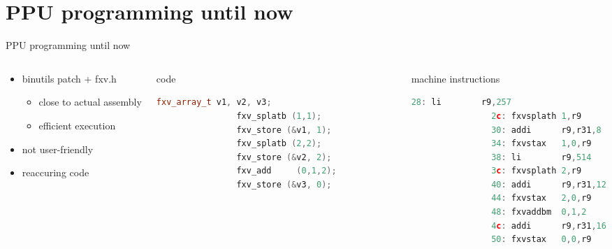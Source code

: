 \documentclass[10pt]{beamer}
\begin{document}
\section{PPU programming until now}
\begin{frame}[fragile]{PPU programming until now}
	\begin{columns}[t]
		\begin{column}{0.35\textwidth}
    		\begin{itemize}
				\item binutils patch + fxv.h
					\begin{itemize}
						\item close to actual assembly
						\item efficient execution
					\end{itemize}
				\item not user-friendly
				\item reaccuring code
			\end{itemize}    
    	\end{column}    
    	\begin{column}{0.25\textwidth}
     		\begin{block}{code}
        		\begin{lstlisting}[language=C++,basicstyle=\ttfamily\scriptsize,keywordstyle=\color{red}]
				fxv_array_t v1, v2, v3;
				fxv_splatb (1,1);
				fxv_store (&v1, 1);
				fxv_splatb (2,2);
				fxv_store (&v2, 2);
				fxv_add 	(0,1,2);
				fxv_store (&v3, 0);				
				\end{lstlisting}
      		\end{block}
    	\end{column}
    	\begin{column}{0.30\textwidth}
    		\begin{block}{machine instructions}
       			\begin{lstlisting}[language=C++,basicstyle=\ttfamily\scriptsize,keywordstyle=\color{red}]
				28: li        r9,257
				2c: fxvsplath 1,r9
				30: addi      r9,r31,8
				34: fxvstax   1,0,r9
				38: li        r9,514
				3c: fxvsplath 2,r9
				40: addi      r9,r31,12
				44: fxvstax   2,0,r9
				48: fxvaddbm  0,1,2
				4c: addi      r9,r31,16
				50: fxvstax   0,0,r9
			\end{lstlisting}
      		\end{block}
		\end{column}
	\end{columns}
\end{frame}
\end{document}

